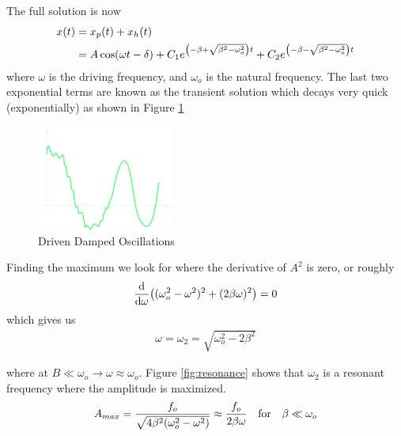 \documentclass[../main.tex]{subfiles}
\begin{document}
\pagebreak
The full solution is now
\begin{align*}
    x(t) &= x_p(t) + x_h(t) \\
        &= A \cos(\omega t - \delta) +  C_1 e^{\qt(-\beta  + \sqrt{\beta^2 - \omega_o^2})t}
        +  C_2 e^{\qt(-\beta  - \sqrt{\beta^2 - \omega_o^2})t}
\end{align*}
where $\omega$ is the driving frequency, and $\omega_o$ is the natural frequency. The last two 
exponential terms are known as the transient solution which decays very quick (exponentially) as
shown in Figure \ref{fig:transientsolution}
\begin{figure}[ht]
    \centering
    \includegraphics[width=0.4\textwidth]{transient.png}
    \caption{Driven Damped Oscillations}
    \label{fig:transientsolution}
\end{figure}
Finding the maximum we look for where the derivative of $A^2$ is zero, or roughly
\begin{align*}
    \dv{\omega} \qt((\omega_o^2 - \omega^2)^2 + (2\beta \omega)^2) = 0
\end{align*}
which gives us
\begin{align*}
    \omega = \omega_2 = \sqrt{\omega_o^2 - 2\beta^2}
\end{align*}

where at $B \ll \omega_o \to \omega \approx \omega_o$. Figure \ref{fig:resonance} shows that
$\omega_2$ is a resonant frequency where the amplitude is maximized.
\begin{align*}
    A_{max} = \frac{f_o}{\sqrt{4\beta^2 (\omega_o^2 - \omega^2)}} \approx \frac{f_o}{2\beta \omega}
    \qqtext{for} \beta \ll \omega_o
\end{align*}
\end{document}
